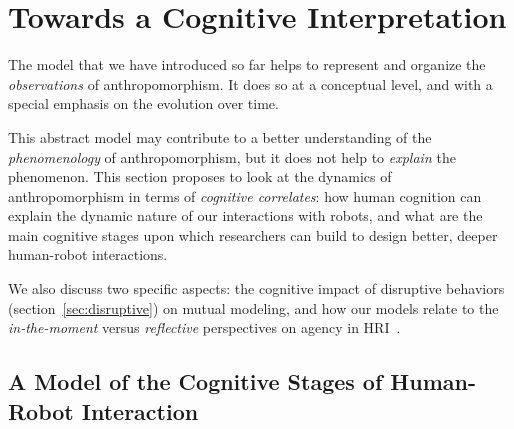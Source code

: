 \documentclass{frontiersSCNS} %
\begin{document}
%
%
%
%
%
%

\section{Towards a Cognitive Interpretation}
\label{sec:cognition-neuroscience}

The model that we have introduced so far helps to represent and organize the
\emph{observations} of anthropomorphism. It does so at a conceptual level, and
with a special emphasis on the evolution over time.

This abstract model may contribute to a better understanding of the
\emph{phenomenology} of anthropomorphism, but it does not help to \emph{explain}
the phenomenon. This section proposes to look at the dynamics of
anthropomorphism in terms of \emph{cognitive correlates}: how human cognition
can explain the dynamic nature of our interactions with robots, and what are the
main cognitive stages upon which researchers can build to design better, deeper
human-robot interactions.

We also discuss two specific aspects: the cognitive impact of disruptive
behaviors (section~\ref{sec:disruptive}) on mutual modeling, and how our models
relate to the \emph{in-the-moment} versus \emph{reflective} perspectives on
agency in HRI~\citep{takayama_perspectives_2012}.


\subsection{A Model of the Cognitive Stages of Human-Robot Interaction}
\label{sec:cognitive-model}
\end{document}
